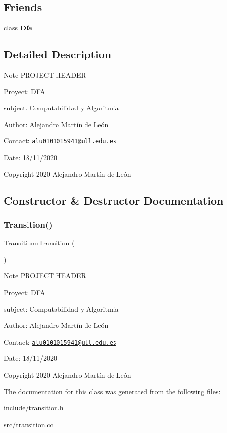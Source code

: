 \subsection*{Friends}
\begin{DoxyCompactItemize}
\item 
\mbox{\label{classTransition_a21ab7f6ff9e8704242e18ecfde24a901}} 
class {\bfseries Dfa}
\end{DoxyCompactItemize}


\subsection{Detailed Description}
\begin{DoxyNote}{Note}
P\+R\+O\+J\+E\+CT H\+E\+A\+D\+ER 

Proyect\+: D\+FA 

subject\+: Computabilidad y Algoritmia 

Author\+: Alejandro Martín de León 

Contact\+: \href{mailto:alu0101015941@ull.edu.es}{\tt alu0101015941@ull.\+edu.\+es} 

Date\+: 18/11/2020 

Copyright 2020 Alejandro Martín de León 
\end{DoxyNote}


\subsection{Constructor \& Destructor Documentation}
\mbox{\label{classTransition_a73b44b2338b11807f77b620a3e810f92}} 
\subsubsection{\texorpdfstring{Transition()}{Transition()}}
{\footnotesize\ttfamily Transition\+::\+Transition (\begin{DoxyParamCaption}{ }\end{DoxyParamCaption})}

\begin{DoxyNote}{Note}
P\+R\+O\+J\+E\+CT H\+E\+A\+D\+ER 

Proyect\+: D\+FA 

subject\+: Computabilidad y Algoritmia 

Author\+: Alejandro Martín de León 

Contact\+: \href{mailto:alu0101015941@ull.edu.es}{\tt alu0101015941@ull.\+edu.\+es} 

Date\+: 18/11/2020 

Copyright 2020 Alejandro Martín de León 
\end{DoxyNote}


The documentation for this class was generated from the following files\+:\begin{DoxyCompactItemize}
\item 
include/transition.\+h\item 
src/transition.\+cc\end{DoxyCompactItemize}
